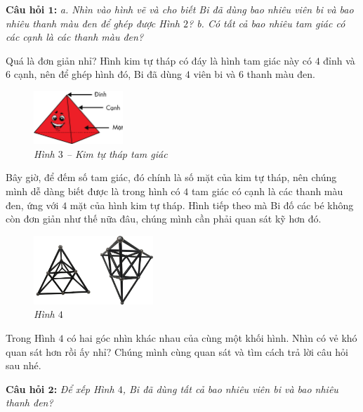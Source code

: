	\textbf{Câu hỏi $\pmb{1}$:} \textit{a. Nhìn vào hình vẽ và cho biết Bi đã dùng bao nhiêu viên bi và bao nhiêu thanh màu đen để ghép được Hình $2$?
	\vskip 0.1cm
	b. Có tất cả bao nhiêu tam giác có các cạnh là các thanh màu đen? }
	\begin{multicols}{2}
		Quá là đơn giản nhỉ? Hình kim tự tháp có đáy là hình tam giác này có $4$ đỉnh và $6$ cạnh, nên để ghép hình đó, Bi đã dùng $4$ viên bi và $6$ thanh màu đen.
		\begin{figure}[H]
			\centering
			\vspace*{5pt}
			\captionsetup{labelformat= empty, justification=centering}
			\includegraphics[width=0.3\textwidth]{3}
			\caption{\small\textit{Hình $3$ -- Kim tự tháp tam giác}}
			\vspace*{-5pt}
		\end{figure}
	\end{multicols}	
	Bây giờ, để đếm số tam giác, đó chính là số mặt của kim tự tháp, nên chúng mình dễ dàng biết được là trong hình có $4$ tam giác có cạnh là các thanh màu đen, ứng với $4$ mặt của hình kim tự tháp.
	\vskip 0.1cm
	Hình tiếp theo mà Bi đố các bé không còn đơn giản như thế nữa đâu, chúng mình cần phải quan sát kỹ hơn đó.
	\begin{multicols}{2}
		\begin{figure}[H]
			\centering
			\vspace*{5pt}
			\captionsetup{labelformat= empty, justification=centering} \includegraphics[width=0.4\textwidth]{4}
			\caption{\small\textit{Hình $4$}}
			\vspace*{-10pt}
		\end{figure}
		Trong Hình $4$ có hai góc nhìn khác nhau của cùng một khối hình. Nhìn có vẻ khó quan sát hơn rồi ấy nhỉ? Chúng mình cùng quan sát và tìm cách trả lời câu hỏi sau nhé.
	\end{multicols}
	\vskip 0.1cm
	\textbf{Câu hỏi $\pmb{2}$:} \textit{Để xếp Hình $4$, Bi đã dùng tất cả bao nhiêu viên bi và bao nhiêu thanh đen?}
